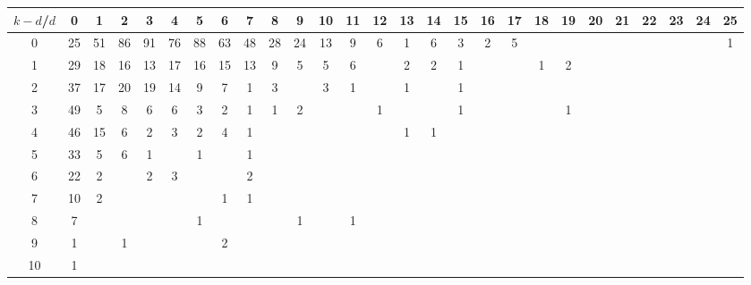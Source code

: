 \documentclass{article}[12pt]
\begin{document}
\begin{landscape}

\begin{table}[h]\footnotesize
{\centering
\begin{tabular}{|c|c|
c|c|c|c|c|c|c|c|c|c|c|c|c|c|c|c|c|c|c|c|c|c|c|c|c|}
  \hline
  $k-d$/$d$ 
 & 0 & 1 & 2 & 3 & 4 & 5 & 6 & 7 & 8 & 9 & 10 & 11 & 12 & 13 & 14 & 15 & 16 & 17 & 18 & 19 & 20 & 21 & 22 & 23 & 24 & 25\\

  \hline
  \hline

0  & 25 & 51 & 86 & 91 & 76 & 88 & 63 & 48 & 28 & 24 & 13 & 9 & 6 & 1 & 6 & 3 & 2 & 5 &  &  &  &  &  &  &  & 1\\

1  & 29 & 18 & 16 & 13 & 17 & 16 & 15 & 13 & 9 & 5 & 5 & 6 &  & 2 & 2 & 1 &  &  & 1 & 2 &  &  &  &  &  & \\

2  & 37 & 17 & 20 & 19 & 14 & 9 & 7 & 1 & 3 &  & 3 & 1 &  & 1 &  & 1 &  &  &  &  &  &  &  &  &  & \\

3  & 49 & 5 & 8 & 6 & 6 & 3 & 2 & 1 & 1 & 2 &  &  & 1 &  &  & 1 &  &  &  & 1 &  &  &  &  &  & \\

4  & 46 & 15 & 6 & 2 & 3 & 2 & 4 & 1 &  &  &  &  &  & 1 & 1 &  &  &  &  &  &  &  &  &  &  & \\

5  & 33 & 5 & 6 & 1 &  & 1 &  & 1 &  &  &  &  &  &  &  &  &  &  &  &  &  &  &  &  &  & \\

6  & 22 & 2 &  & 2 & 3 &  &  & 2 &  &  &  &  &  &  &  &  &  &  &  &  &  &  &  &  &  & \\

7  & 10 & 2 &  &  &  &  & 1 & 1 &  &  &  &  &  &  &  &  &  &  &  &  &  &  &  &  &  & \\

8  & 7 &  &  &  &  & 1 &  &  &  & 1 &  & 1 &  &  &  &  &  &  &  &  &  &  &  &  &  & \\

9  & 1 &  & 1 &  &  &  & 2 &  &  &  &  &  &  &  &  &  &  &  &  &  &  &  &  &  &  & \\

10  & 1 &  &  &  &  &  &  &  &  &  &  &  &  &  &  &  &  &  &  &  &  &  &  &  &  & \\


\end{tabular}}
\end{table}
\end{landscape}
\end{document}
